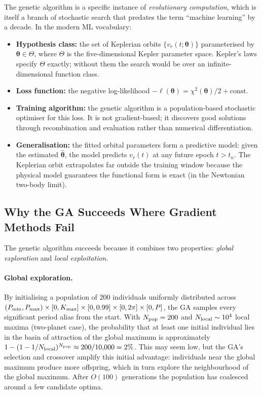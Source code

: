 \documentclass[12pt]{article}
\begin{document}
The genetic algorithm is a specific instance of \emph{evolutionary
computation}, which is itself a branch of stochastic search that predates
the term ``machine learning'' by a decade.  In the modern ML vocabulary:
\begin{itemize}
  \item \textbf{Hypothesis class:} the set of Keplerian orbits
    $\{v_r(t;\boldsymbol\theta)\}$ parameterised by
    $\boldsymbol\theta \in \Theta$, where $\Theta$ is the five-dimensional
    Kepler parameter space.  Kepler's laws specify $\Theta$ exactly;
    without them the search would be over an infinite-dimensional
    function class.
  \item \textbf{Loss function:} the negative log-likelihood
    $-\ell(\boldsymbol\theta) = \chi^2(\boldsymbol\theta)/2 + \text{const}$.
  \item \textbf{Training algorithm:} the genetic algorithm is a
    population-based stochastic optimiser for this loss.  It is not
    gradient-based; it discovers good solutions through recombination
    and evaluation rather than numerical differentiation.
  \item \textbf{Generalisation:} the fitted orbital parameters form
    a predictive model: given the estimated $\hat{\boldsymbol\theta}$,
    the model predicts $v_r(t)$ at any future epoch $t > t_n$.
    The Keplerian orbit extrapolates far outside the training window
    because the physical model guarantees the functional form is exact
    (in the Newtonian two-body limit).
\end{itemize}

\subsection{Why the GA Succeeds Where Gradient Methods Fail}

The genetic algorithm succeeds because it combines two properties:
\emph{global exploration} and \emph{local exploitation}.

\paragraph{Global exploration.}
By initialising a population of 200 individuals uniformly distributed
across $(P_{\rm min}, P_{\rm max}) \times [0, K_{\rm max}] \times
[0, 0.99] \times [0, 2\pi] \times [0, P]$, the GA samples every
significant period alias from the start.  With $N_{\rm pop} = 200$
and $N_{\rm local} \sim 10^4$ local maxima (two-planet case), the
probability that at least one initial individual lies in the basin
of attraction of the global maximum is approximately
$1 - (1 - 1/N_{\rm local})^{N_{\rm pop}} \approx
200/10{,}000 = 2\%$.  This may seem low, but the GA's selection
and crossover amplify this initial advantage: individuals near the
global maximum produce more offspring, which in turn explore
the neighbourhood of the global maximum.  After $O(100)$ generations
the population has coalesced around a few candidate optima.
\end{document}
